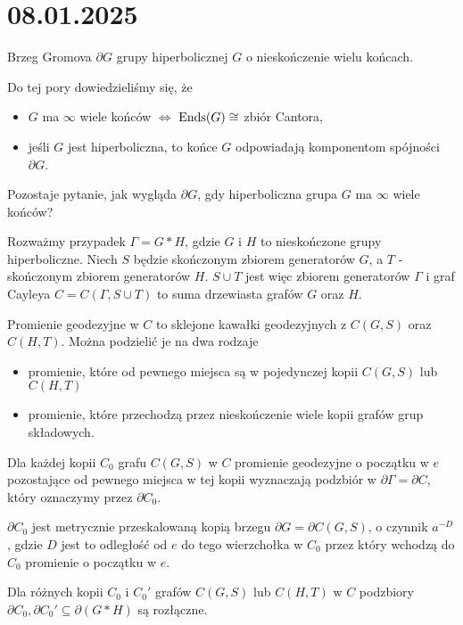 \section{08.01.2025}{Brzeg Gromova $\partial G$ grupy hiperbolicznej $G$ o nieskończenie wielu końcach.}

Do tej pory dowiedzieliśmy się, że
\begin{itemize}
  \item $G$ ma $\infty$ wiele końców $\iff$ $\operatorname{Ends}(G)\cong$ zbiór Cantora,
  \item jeśli $G$ jest hiperboliczna, to końce $G$ odpowiadają komponentom spójności $\partial G$.
\end{itemize}

Pozostaje pytanie, jak wygląda $\partial G$, gdy hiperboliczna grupa $G$ ma $\infty$ wiele końców?

Rozważmy przypadek $\Gamma=G\ast H$, gdzie $G$ i $H$ to nieskończone grupy hiperboliczne. Niech $S$ będzie skończonym zbiorem generatorów $G$, a $T$ - skończonym zbiorem generatorów $H$. $S\cup T$ jest więc zbiorem generatorów $\Gamma$ i graf Cayleya $C=C(\Gamma, S\cup T)$ to suma drzewiasta grafów $G$ oraz $H$.

Promienie geodezyjne w $C$ to sklejone kawałki geodezyjnych z $C(G,S)$ oraz $C(H,T)$. Można podzielić je na dwa rodzaje
\begin{itemize}
  \item promienie, które od pewnego miejsca są w pojedynczej kopii $C(G,S)$ lub $C(H,T)$
  \item promienie, które przechodzą przez nieskończenie wiele kopii grafów grup składowych.
\end{itemize}
Dla każdej kopii $C_0$ grafu $C(G,S)$ w $C$ promienie geodezyjne o początku w $e$ pozostające od pewnego miejsca w tej kopii wyznaczają podzbiór w $\partial\Gamma=\partial C$, który oznaczymy przez $\partial C_0$.

\begin{fact}{}{}
  $\partial C_0$ jest metrycznie przeskalowaną kopią brzegu $\partial G=\partial C(G,S)$, o czynnik $a^{-D}$, gdzie $D$ jest to odległość od $e$ do tego wierzchołka w $C_0$ przez który wchodzą do $C_0$ promienie o początku w $e$.
\end{fact}

\begin{fact}{}{}
  Dla różnych kopii $C_0$ i $C_0'$ grafów $C(G,S)$ lub $C(H,T)$ w $C$ podzbiory $\partial C_0,\partial C_0'\subseteq\partial (G\ast H)$ są rozłączne.
\end{fact}

